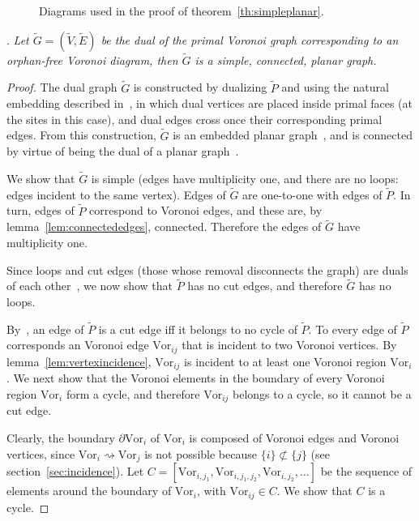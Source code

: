 \documentclass[11pt]{article}
\newcommand{\Vor}{\text{Vor}}
\begin{document}
\begin{figure}[htbp]
   \centering
	\quad\quad
   \caption{Diagrams used in the proof of theorem~\ref{th:simpleplanar}. }
\end{figure}



\vspace*{0.1in}. \emph{
Let $\tilde{G}=(\tilde{V}, \tilde{E})$ be the dual of the primal Voronoi graph corresponding to an orphan-free Voronoi diagram, then $\tilde{G}$ is a simple, connected, planar graph. 
}
\begin{proof}
The dual graph $\tilde{G}$ is constructed by dualizing $\tilde{P}$ 
	and using the natural embedding described in~\cite[p.\ 252]{bondy2008graph}, 
	in which dual vertices are placed inside primal faces (at the sites in this case), 
	and dual edges cross once their corresponding primal edges. 
From this construction, $\tilde{G}$ is an embedded planar graph~\cite[p.\ 252]{bondy2008graph}, 
	and is connected by virtue of being the dual of a planar graph~\cite[p.\ 253]{bondy2008graph}. 

We show that $\tilde{G}$ is simple (edges have multiplicity one, and there are no loops: edges incident to the same vertex). 
Edges of $\tilde{G}$ are one-to-one with edges of $\tilde{P}$. 
In turn, edges of $\tilde{P}$ correspond to Voronoi edges, and these are, 
	by lemma~\ref{lem:connectededges}, 
	connected. 
Therefore the edges of $\tilde{G}$ have multiplicity one. 

Since loops and cut edges (those whose removal disconnects the graph) 
	are duals of each other~\cite[p.\ 252]{bondy2008graph}, 
	we now show that $\tilde{P}$ has no cut edges, and therefore $\tilde{G}$ has no loops. 

By~\cite[p.\ 86]{bondy2008graph}, 
	an edge of $\tilde{P}$ is a cut edge iff it belongs to no cycle of $\tilde{P}$. 
To every edge of $\tilde{P}$ corresponds an Voronoi edge $\Vor_{ij}$ that is incident to two Voronoi vertices. 
By lemma~\ref{lem:vertexincidence}, 
	$\Vor_{ij}$ is incident to at least one Voronoi region $\Vor_i$. 
We next show that the Voronoi elements in the boundary of every Voronoi region $\Vor_i$ form a cycle, 
	and therefore $\Vor_{ij}$ belongs to a cycle, so it cannot be a cut edge. 

Clearly, the boundary $\partial \Vor_i$ of $\Vor_i$ is composed of Voronoi edges and Voronoi vertices, 
	since $\Vor_i\rightsquigarrow\Vor_j$ is not possible because $\{i\}\not\subset\{j\}$ (see section~\ref{sec:incidence}). 
Let $C=\left[\Vor_{i,j_1},\Vor_{i,j_1,j_2}, \Vor_{i,j_2}, \dots\right]$ be the sequence of elements around the boundary of $\Vor_i$, 
	with $\Vor_{ij}\in C$. 
	We show that $C$ is a cycle. 


\end{proof}
\end{document}

